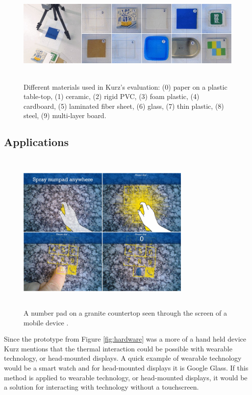 \documentclass{sig-alternate}
\begin{document}
\begin{figure}
	\includegraphics[width=18cm, height=5cm]{ThermalTesting}
	\caption{Different materials used in Kurz's evaluation: (0) paper on a plastic table-top, (1) ceramic, (2) rigid PVC, (3) foam plastic, (4) cardboard, (5) laminated fiber sheet, (6) glass, (7) thin plastic, (8) steel, (9) multi-layer board. \cite{Thermal}}
	\label{fig:ThermalTest}
\end{figure}

\subsection{Applications}
\label{Thermal Applications}

\begin{figure}
	\includegraphics[width=8.5cm, height=8cm]{numpad}
	\caption{A number pad on a granite countertop seen through the screen of a mobile device \cite{Thermal}.}
	\label{fig:numpad}
\end{figure}

Since the prototype from Figure \ref{fig:hardware} was a more of a hand held device Kurz mentions that the thermal interaction could be possible with wearable technology, or head-mounted displays. A quick example of wearable technology would be a smart watch and for head-mounted displays it is Google Glass. If this method is applied to wearable technology, or head-mounted displays, it would be a solution for interacting with technology without a touchscreen.     
\end{document}
